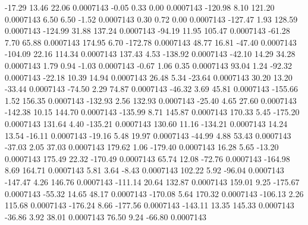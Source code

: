       -17.29       13.46       22.06     0.0007143
       -0.05        0.33        0.00     0.0007143
     -120.98        8.10      121.20     0.0007143
        6.50        6.50       -1.52     0.0007143
        0.30        0.72        0.00     0.0007143
     -127.47        1.93      128.59     0.0007143
     -124.99       31.88      137.24     0.0007143
      -94.19       11.95      105.47     0.0007143
      -61.28        7.70       65.88     0.0007143
      174.95        6.70     -172.78     0.0007143
       48.77       16.81      -47.40     0.0007143
     -104.09       22.16      114.34     0.0007143
      137.43        4.53     -138.92     0.0007143
      -42.10       14.29       34.28     0.0007143
        1.79        0.94       -1.03     0.0007143
       -0.67        1.06        0.35     0.0007143
       93.04        1.24      -92.32     0.0007143
      -22.18       10.39       14.94     0.0007143
       26.48        5.34      -23.64     0.0007143
       30.20       13.20      -33.44     0.0007143
      -74.50        2.29       74.87     0.0007143
      -46.32        3.69       45.81     0.0007143
     -155.66        1.52      156.35     0.0007143
     -132.93        2.56      132.93     0.0007143
      -25.40        4.65       27.60     0.0007143
     -142.38       10.15      144.70     0.0007143
     -135.99        8.71      145.87     0.0007143
      170.33        5.45     -175.20     0.0007143
      131.64        4.40     -135.21     0.0007143
      130.60       11.16     -134.21     0.0007143
       14.24       13.54      -16.11     0.0007143
      -19.16        5.48       19.97     0.0007143
      -44.99        4.88       53.43     0.0007143
      -37.03        2.05       37.03     0.0007143
      179.62        1.06     -179.40     0.0007143
       16.28        5.65      -13.20     0.0007143
      175.49       22.32     -170.49     0.0007143
       65.74       12.08      -72.76     0.0007143
     -164.98        8.69      164.71     0.0007143
        5.81        3.64       -8.43     0.0007143
      102.22        5.92      -96.04     0.0007143
     -147.47        4.26      146.76     0.0007143
     -111.14       20.64      132.87     0.0007143
      159.01        9.25     -175.67     0.0007143
      -55.32       14.65       48.17     0.0007143
     -170.08        5.64      170.32     0.0007143
     -106.13        2.26      115.68     0.0007143
     -176.24        8.66     -177.56     0.0007143
     -143.11       13.35      145.33     0.0007143
      -36.86        3.92       38.01     0.0007143
       76.50        9.24      -66.80     0.0007143
